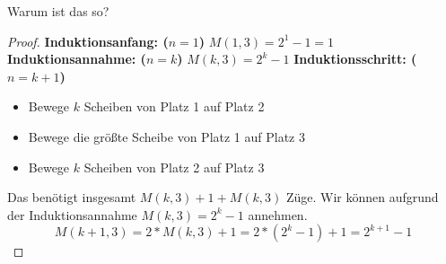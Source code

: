 \begin{frame}{Warum ist das so?}
    \begin{proof}
    \textbf{Induktionsanfang: ($n=1$)} $M(1,3) = 2^1-1 = 1$
    \textbf{Induktionsannahme: ($n=k$)} $M(k,3) = 2^k-1$
    \textbf{Induktionsschritt: ($n= k+1$)}
    \begin{itemize}
        \item Bewege $k$ Scheiben von Platz 1 auf Platz 2
        \item Bewege die größte Scheibe von Platz 1 auf Platz 3
        \item Bewege $k$ Scheiben von Platz 2 auf Platz 3
    \end{itemize}
    Das benötigt insgesamt $M(k,3)+1+M(k,3)$ Züge. Wir können aufgrund der Induktionsannahme $M(k,3) = 2^k-1$ annehmen.
    \[M(k+1,3) = 2*M(k,3)+1 = 2*(2^k-1)+1 = 2^{k+1}-1\]
    \end{proof}
\end{frame}